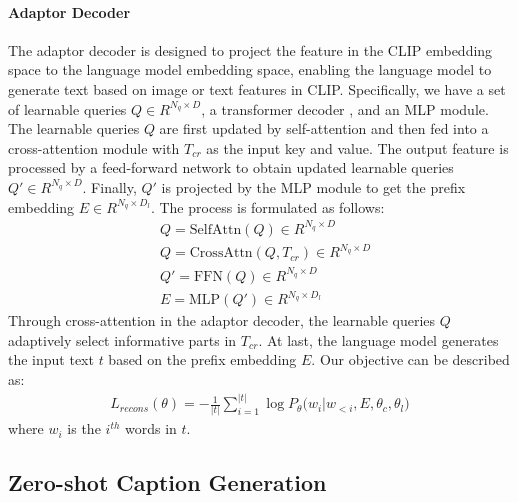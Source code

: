 \paragraph{\textbf{Adaptor Decoder}}
The adaptor decoder is designed to project the feature in the CLIP embedding space to the language model embedding space, enabling the language model to generate text based on image or text features in CLIP. Specifically, we have a set of learnable queries $Q \in R^{N_q \times D}$, a transformer decoder \cite{Vaswani2017AttentionIA}, and an MLP module. The learnable queries $Q$ are first updated by self-attention and then fed into a cross-attention module with $T_{cr}$ as the input key and value. The output feature is processed by a feed-forward network to obtain updated learnable queries $Q' \in R^{N_q \times D}$. Finally, $Q'$ is projected by the MLP module to get the prefix embedding $E \in R^{N_q \times D_l}$. The process is formulated as follows:
\begin{align}
    &Q = \mathrm{SelfAttn}(Q) \in R^{N_{q} \times D}  \\
    &Q = \mathrm{CrossAttn}(Q, T_{cr})\in R^{N_{q} \times D} \\
    &Q' = \mathrm{FFN}(Q)\in R^{N_{q} \times D} \\
    &E = \mathrm{MLP}(Q')\in R^{N_{q} \times D_l}
\end{align}
Through cross-attention in the adaptor decoder, the learnable queries $Q$ adaptively select informative parts in $T_{cr}$. At last, the language model generates the input text $t$ based on the prefix embedding $E$. Our objective can be described as:
\begin{align}
   L_{recons}(\theta) = - \frac{1}{|t|} \sum_{i=1}^{|t|} {\log P_{\theta}(w_i|w_{<i}, E, \theta_{c}, \theta_{l}})
\end{align}
where $w_i$ is the $i^{th}$ words in $t$.

\subsection{Zero-shot Caption Generation}

